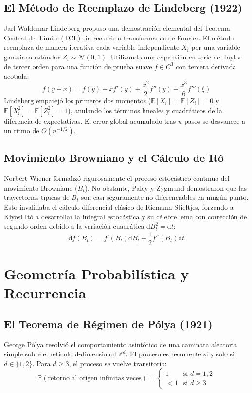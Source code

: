 \documentclass[11pt,a4paper]{article}
\begin{document}
\subsection{El Método de Reemplazo de Lindeberg (1922)}
Jarl Waldemar Lindeberg propuso una demostración elemental del Teorema Central del Límite (TCL) sin recurrir a transformadas de Fourier. El método reemplaza de manera iterativa cada variable independiente $X_i$ por una variable gaussiana estándar $Z_i \sim \mathcal{N}(0,1)$. Utilizando una expansión en serie de Taylor de tercer orden para una función de prueba suave $f \in C^3$ con tercera derivada acotada:
\[ f(y+x) = f(y) + x f'(y) + \frac{x^2}{2} f''(y) + \frac{x^3}{6} f'''(\xi) \]
Lindeberg emparejó los primeros dos momentos ($\mathbb{E}[X_i] = \mathbb{E}[Z_i] = 0$ y $\mathbb{E}[X_i^2] = \mathbb{E}[Z_i^2] = 1$), anulando los términos lineales y cuadráticos de la diferencia de expectativas. El error global acumulado tras $n$ pasos se desvanece a un ritmo de $O(n^{-1/2})$.

\subsection{Movimiento Browniano y el Cálculo de It\^o}
Norbert Wiener formalizó rigurosamente el proceso estocástico continuo del movimiento Browniano ($B_t$). No obstante, Paley y Zygmund demostraron que las trayectorias típicas de $B_t$ son casi seguramente no diferenciables en ningún punto. Esto invalidaba el cálculo diferencial clásico de Riemann-Stieltjes, forzando a Kiyosi It\^o a desarrollar la integral estocástica y su célebre lema con corrección de segundo orden debido a la variación cuadrática $\text{d}B_t^2 = \text{d}t$:
\begin{equation}
\text{d}f(B_t) = f'(B_t)\text{d}B_t + \frac{1}{2}f''(B_t)\text{d}t
\end{equation}

\section{Geometría Probabilística y Recurrencia}

\subsection{El Teorema de Régimen de Pólya (1921)}
George Pólya resolvió el comportamiento asintótico de una caminata aleatoria simple sobre el retículo d-dimensional $\mathbb{Z}^d$. El proceso es recurrente si y solo si $d \in \{1, 2\}$. Para $d \ge 3$, el proceso se vuelve transitorio:
\[ \mathbb{P}(\text{retorno al origen infinitas veces}) = \begin{cases} 1 & \text{si } d = 1, 2 \\ < 1 & \text{si } d \ge 3 \end{cases} \]
\end{document}
